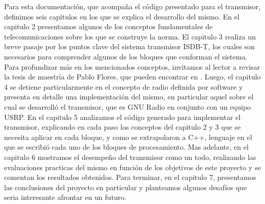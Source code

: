Para esta documentación, que acompaña el código presentado para el transmisor, definimos seis capítulos en los que se explica el desarrollo del mismo. En el capitulo 2 presentamos algunos de los conceptos fundamentales de telecomunicaciones sobre los que se construye la norma. El capitulo 3 realiza un breve pasaje por los puntos clave del sistema transmisor ISDB-T, los cuales son necesarios para comprender algunos de los bloques que conforman el sistema. Para profundizar más en los mencionados conceptos, invitamos al lector a revisar la tesis de maestría de Pablo Flores, que pueden encontrar en \cite{gr-isdbt}. Luego, el capitulo 4 se detiene particularmente en el concepto de radio definida por software y  presenta en detalle una implementación del mismo, en particular aquel sobre el cual se desarrolló el transmisor, que es GNU Radio en conjunto con un equipo USRP. En el capitulo 5 analizamos el código generado para implementar el transmisor, explicando en cada paso los conceptos del capitulo 2 y 3 que se necesita aplicar en cada bloque, y como se extrapolaron a C++, lenguaje en el que se escribió cada uno de los bloques de procesamiento. Mas adelante, en el capitulo 6 mostramos el desempeño del transmisor como un todo, realizando las evaluaciones practicas del mismo en función de los objetivos de este proyecto y se comentan los resultados obtenidos. Para terminar, en el capitulo 7, presentamos las conclusiones del proyecto en particular y planteamos algunos desafíos que seria interesante afrontar en un futuro.






